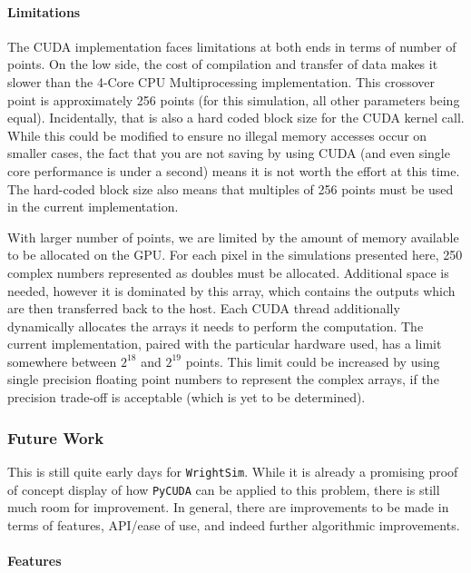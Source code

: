 \hypertarget{limitations}{%
\paragraph{Limitations}\label{limitations}}

The CUDA implementation faces limitations at both ends in terms of
number of points. On the low side, the cost of compilation and transfer
of data makes it slower than the 4-Core CPU Multiprocessing
implementation. This crossover point is approximately 256 points (for
this simulation, all other parameters being equal). Incidentally, that
is also a hard coded block size for the CUDA kernel call. While this
could be modified to ensure no illegal memory accesses occur on smaller
cases, the fact that you are not saving by using CUDA (and even single
core performance is under a second) means it is not worth the effort at
this time. The hard-coded block size also means that multiples of 256
points must be used in the current implementation.

With larger number of points, we are limited by the amount of memory
available to be allocated on the GPU. For each pixel in the simulations
presented here, 250 complex numbers represented as doubles must be
allocated. Additional space is needed, however it is dominated by this
array, which contains the outputs which are then transferred back to the
host. Each CUDA thread additionally dynamically allocates the arrays it
needs to perform the computation. The current implementation, paired
with the particular hardware used, has a limit somewhere between
\(2^{18}\) and \(2^{19}\) points. This limit could be increased by using
single precision floating point numbers to represent the complex arrays,
if the precision trade-off is acceptable (which is yet to be
determined).

\hypertarget{future-work}{%
\subsubsection{Future Work}\label{future-work}}

This is still quite early days for \texttt{WrightSim}. While it is
already a promising proof of concept display of how \texttt{PyCUDA} can
be applied to this problem, there is still much room for improvement. In
general, there are improvements to be made in terms of features,
API/ease of use, and indeed further algorithmic improvements.

\hypertarget{features}{%
\paragraph{Features}\label{features}}

